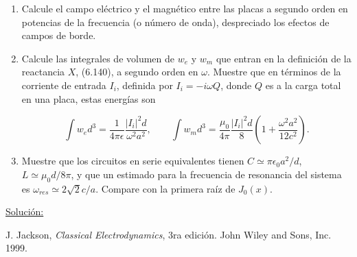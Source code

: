 \documentclass[a4paper,11pt]{article}
\numberwithin{equation}{section}
\begin{document}
\begin{enumerate}[label=\textbf{(\alph*)}]
\item Calcule el campo eléctrico y el magnético entre las placas a segundo orden 
en potencias de la frecuencia (o número de onda), despreciado los efectos de campos 
de borde.
\item Calcule las integrales de volumen de $w_e$ y $w_m$ que entran en la definición 
de la reactancia $X$, (6.140), a segundo orden en $\omega$. Muestre que en términos 
de la corriente de entrada $I_i$, definida por $I_i = - i\omega Q$, donde $Q$ es 
a la carga total en una placa, estas energías son 

$$
\int w_e d^3 = \frac{1}{4\pi\epsilon}\frac{|I_i|^2d}{\omega^2 a^2}, \qquad 
\int w_m d^3 = \frac{\mu_0}{4\pi}\frac{|I_i|^2d}{8}\left(1 +
\frac{\omega^2 a^2}{12c^2} \right).
$$
\item Muestre que los circuitos en serie equivalentes tienen $C \simeq \pi\epsilon_0 
a^2/d$, $L \simeq \mu_0d/8\pi$, y que un estimado para la frecuencia de resonancia 
del sistema es $\omega_{res} \simeq 2\sqrt{2}c/a$. Compare con la primera raíz 
de $J_0(x)$.
\end{enumerate}

\vspace{.3cm}

\underline{Solución:} \vspace{.3cm}

\newpage

\begin{thebibliography}{10}
J. Jackson, \emph{Classical Electrodynamics}, 3ra edición. John Wiley and Sons, Inc. 
1999.
\end{thebibliography}
\end{document}
